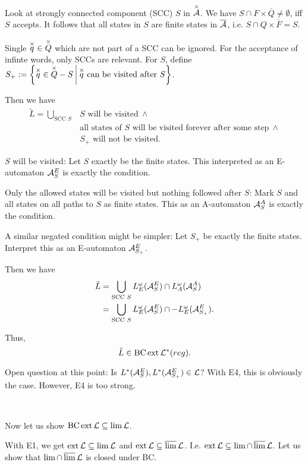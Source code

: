 Look at strongly connected component (SCC) $S$ in $\overset{\times}{\mathcal{A}}$. We have $S \cap F \times \overline Q \neq \emptyset$, iff $S$ accepts. It follows that all states in $S$ are finite states in $\overline {\mathcal{A}}$, i.e. $S \cap Q \times \overline F = S$.

Single $\overset{\times}{q} \in \overset{\times}{Q}$ which are not part of a SCC can be ignored. For the acceptance of infinte words, only SCCs are relevant. For $S$, define $S_+ := \Set{\overx{q} \in \overx{Q}-S}{\overx{q} \text{ can be visited after } S}$.

Then we have
\begin{align*}
\tilde L = \bigcup_{\text{SCC } S} & S \text{ will be visited} \ \wedge \\
& \text{all states of } S \text{ will be visited forever after some step} \ \wedge \\
& S_+ \text{ will not be visited} .
\end{align*}

$S$ will be visited: Let $S$ exactly be the finite states. This interpreted as an E-automaton $\mathcal{A}^E_S$ is exactly the condition.

Only the allowed states will be visited but nothing followed after $S$: Mark $S$ and all states on all paths to $S$ as finite states. This as an A-automaton $\mathcal{A}^A_S$ is exactly the condition.

A similar negated condition might be simpler: Let $S_+$ be exactly the finite states. Interpret this as an E-automaton $\mathcal{A}^E_{S_+}$.

Then we have
\begin{align*}
\tilde L & = \bigcup_{\text{SCC } S} L^\omega_E (\mathcal{A}^E_S) \cap L^\omega_A (\mathcal{A}^A_S) \\
& = \bigcup_{\text{SCC } S} L^\omega_E (\mathcal{A}^E_S) \cap -L^\omega_E (\mathcal{A}^E_{S_+}) .
\end{align*}

Thus,
\[ \tilde L \in \operatorname{BC} \operatorname{ext} \mathcal{L}^*(reg) . \]

Open question at this point: Is $L^*(\mathcal{A}^E_S), L^*(\mathcal{A}^E_{S_+}) \in \mathcal{L}$? With E4, this is obviously the case. However, E4 is too strong.

\

Now let us show $\operatorname{BC} \operatorname{ext} \mathcal{L} \subseteq \lim \mathcal{L}$.

With E1, we get $\operatorname{ext} \mathcal{L} \subseteq \lim \mathcal{L}$ and $\operatorname{ext} \mathcal{L} \subseteq \operatorname{\overline{lim}} \mathcal{L}$. I.e. $\operatorname{ext} \mathcal{L} \subseteq \lim \cap \operatorname{\overline{lim}} \mathcal{L}$. Let us show that $\lim \cap \operatorname{\overline{lim}} \mathcal{L}$ is closed under BC.

